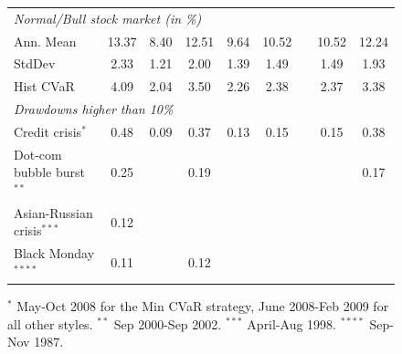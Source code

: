 \documentclass[11pt]{article}
\begin{document}
\begin{figure}[tb]
\begin{center}
{\begin{tabular}{|l c cccc c cc| }
 \multicolumn{9}{|l|}{\emph{Normal/Bull stock market (in \%)}} \\
Ann. Mean        	         &           13.37	    	    & 8.40	      & 12.51	        & 9.64	 & 10.52         & & 10.52  & 12.24      \\
StdDev            	         &           2.33               & 1.21	      & 2.00	        & 1.39   & 1.49          & & 1.49  & 1.93     \\
Hist  CVaR                   &	        4.09                & 2.04        &	3.50            & 2.26   & 2.38         & & 2.37  & 3.38   \\
 \hline \multicolumn{9}{|l|}{ \emph{Drawdowns higher than 10\%}  }  \\
Credit crisis$^{*}$       &             0.48                & 0.09    	 & 0.37	           &0.13    & 0.15  	       & & 0.15 & 0.38            \\
Dot-com bubble burst$^{**}$&            0.25               &	        & 0.19             &	    &               & &       & 0.17              \\
Asian-Russian crisis$^{***}$	&        0.12              &           &	               &	    &              & &      &               \\	%
Black Monday$^{****}$	    &            0.11            &              & 0.12	      	   &	   &          &       &          &               \\
 \hline
\end{tabular}
}
\end{center}
{\scriptsize $^{*}$ May-Oct 2008 for the Min CVaR strategy,  June 2008-Feb 2009 for all other styles. $^{**}$ Sep 2000-Sep 2002.
\newline $^{***}$ April-Aug 1998. $^{****}$ Sep-Nov 1987. }
\end{figure}
\end{document}
